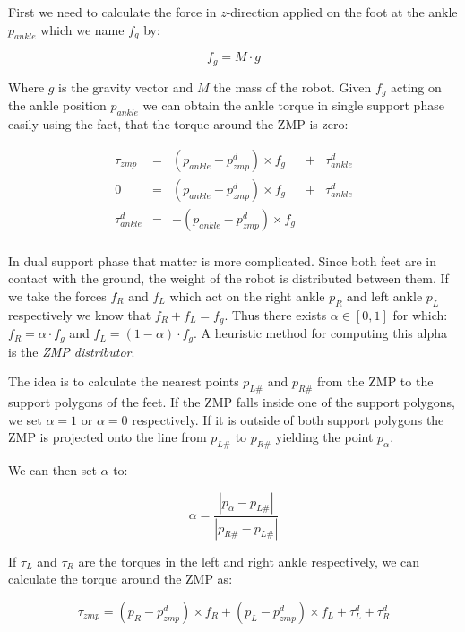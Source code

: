 \documentclass[english,ngerman]{KITreprt}
\begin{document}
First we need to calculate the force in $z$-direction applied on the
foot at the ankle $p_{ankle}$ which we name $f_g$ by:

\begin{equation}
f_g = M \cdot g
\end{equation}

Where $g$ is the gravity vector and $M$ the mass of the robot. Given
$f_g$ acting on the ankle position $p_{ankle}$ we can obtain the ankle
torque in single support phase easily using the fact, that the torque
around the ZMP is zero:

\begin{equation}
\begin{array}{lcccr}
\tau_{zmp} & = & (p_{ankle} - p^d_{zmp}) \times f_g & + & \tau^d_{ankle} \\
0 & = & (p_{ankle} - p^d_{zmp}) \times f_g & + & \tau^d_{ankle} \\
\tau^d_{ankle} & = & -(p_{ankle} - p^d_{zmp}) \times f_g & & \\
\end{array}
\end{equation}

In dual support phase that matter is more complicated. Since both feet
are in contact with the ground, the weight of the robot is distributed
between them. If we take the forces $f_R$ and $f_L$ which act on the
right ankle $p_R$ and left ankle $p_L$ respectively we know that
$f_R + f_L = f_g$. Thus there exists $\alpha \in [0, 1]$ for which:
$f_R = \alpha \cdot f_g$ and $f_L = (1-\alpha) \cdot f_g$. A heuristic
method for computing this alpha is the \emph{ZMP distributor}.

The idea is to calculate the nearest points $p_{L\#}$ and $p_{R\#}$ from
the ZMP to the support polygons of the feet. If the ZMP falls inside one
of the support polygons, we set $\alpha = 1$ or $\alpha = 0$
respectively. If it is outside of both support polygons the ZMP is
projected onto the line from $p_{L\#}$ to $p_{R\#}$ yielding the point
$p_{\alpha}$.

We can then set $\alpha$ to:

\begin{equation}
\alpha = \frac{|p_{\alpha} - p_{L\#}|}{|p_{R\#} - p_{L\#}|}
\end{equation}

If $\tau_L$ and $\tau_R$ are the torques in the left and right ankle
respectively, we can calculate the torque around the ZMP as:

\begin{equation} \label{eq:ds-torque}
\tau_{zmp} = (p_R - p^d_{zmp}) \times f_R + (p_L - p^d_{zmp}) \times f_L + \tau^d_L + \tau^d_R
\end{equation}
\end{document}
